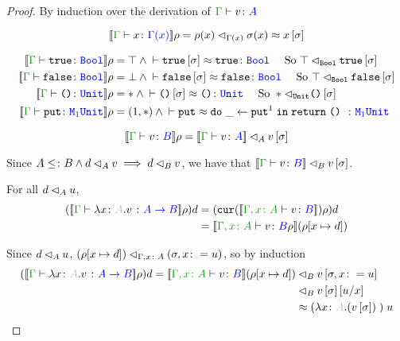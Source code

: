 \documentclass{Report}
\begin{document}
\begin{proof}
    By induction over the derivation of $\gtyperelation{v}{A}$

    \begin{equation}
        \deno{\gtyperelation{x}{\G(x)}}\rho = \logRel{\rho(x)}{\G(x)}{\si(x)}\beequiv x\ssi
    \end{equation}

    \begin{align}
        \deno{\gtyperelation{\t}{\B}} \rho & = \top \wedge \zberelation{\t\ssi}{\t}{\B} \qt{ So } \logRel{\top}{\B}{\t\ssi}\\
        \deno{\gtyperelation{\f}{\B}} \rho & = \bot \wedge \zberelation{\f\ssi}{\f}{\B} \qt{ So } \logRel{\top}{\B}{\f\ssi}\\
        \deno{\gtyperelation{\u}{\U}} \rho & = \singleton \wedge \zberelation{\u\ssi}{\u}{\U} \qt{ So } \logRel{\singleton}{\U}{\u\ssi}\\
        \deno{\gtyperelation{\put}{\M{1}{\U}}} \rho & = (1, \singleton)\wedge \zberelation{\put}{\doin{\_}{\put^1}{\return{\u}}}{\M{1}{\U}}\\ 
    \end{align}



    \begin{equation}
        \deno{\gtyperelation{v}{B}}\rho = \logRel{\deno{\gtyperelation{v}{A}}}{A}{v\ssi}
    \end{equation}

    Since $A\leq\colon B \wedge d \lhd_{A} v \implies d \lhd_{B} v$, we have that $\logRel{\deno{\gtyperelation{v}{B}}}{B}{v\ssi}$.


    For all $d \lhd_{A} u$, 
    \begin{align}
        (\deno{\gtyperelation{\lam{x}{A}{v}}{\ab}}\rho)d & = (\cur{\deno{\typerelation{\gax}{v}{B}}}\rho)d\\
        & = \deno{\typerelation{\gax}{v}{B}\rho}(\rho[x\mapsto d])\\
    \end{align}

    Since $d \lhd_{A} u$, $(\rho[x\mapsto d]) \lhd_{\Gamma, x\colon A} (\sigma, x\colon= u)$, so by induction
    \begin{align}
        (\deno{\gtyperelation{\lam{x}{A}{v}}{\ab}}\rho)d = \logRel{\deno{\typerelation{\gax}{v}{B}}(\rho[x\mapsto d])&}{B}{v\sub{\si, x\setto u}}
        \\
        \logRel{&}{B}{v\ssi\ssub{x}{u}}\\
        & \beequiv \apply{(\lam{x}{A}{(v\ssi)})}{u}
    \end{align}
\end{proof}
\end{document}
